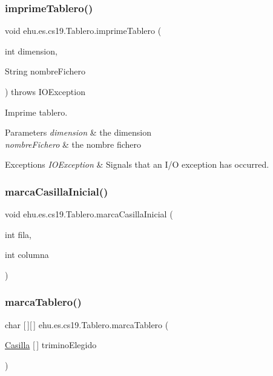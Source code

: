 \subsubsection{\texorpdfstring{imprimeTablero()}{imprimeTablero()}}
{\footnotesize\ttfamily void ehu.\+es.\+cs19.\+Tablero.\+imprime\+Tablero (\begin{DoxyParamCaption}\item[{int}]{dimension,  }\item[{String}]{nombre\+Fichero }\end{DoxyParamCaption}) throws I\+O\+Exception}

Imprime tablero.


\begin{DoxyParams}{Parameters}
{\em dimension} & the dimension \\
\hline
{\em nombre\+Fichero} & the nombre fichero \\
\hline
\end{DoxyParams}

\begin{DoxyExceptions}{Exceptions}
{\em I\+O\+Exception} & Signals that an I/O exception has occurred. \\
\hline
\end{DoxyExceptions}
\mbox{\label{classehu_1_1es_1_1cs19_1_1_tablero_ae11f212fa702b46fabaf56b1a8260ac2}} 
\subsubsection{\texorpdfstring{marcaCasillaInicial()}{marcaCasillaInicial()}}
{\footnotesize\ttfamily void ehu.\+es.\+cs19.\+Tablero.\+marca\+Casilla\+Inicial (\begin{DoxyParamCaption}\item[{int}]{fila,  }\item[{int}]{columna }\end{DoxyParamCaption})}

\mbox{\label{classehu_1_1es_1_1cs19_1_1_tablero_a902d0a64d3f7648130c66cfa4d1bca4d}} 
\subsubsection{\texorpdfstring{marcaTablero()}{marcaTablero()}}
{\footnotesize\ttfamily char \mbox{[}$\,$\mbox{]}\mbox{[}$\,$\mbox{]} ehu.\+es.\+cs19.\+Tablero.\+marca\+Tablero (\begin{DoxyParamCaption}\item[{\mbox{\hyperlink{classehu_1_1es_1_1cs19_1_1_casilla}{Casilla}} \mbox{[}$\,$\mbox{]}}]{trimino\+Elegido }\end{DoxyParamCaption})}

